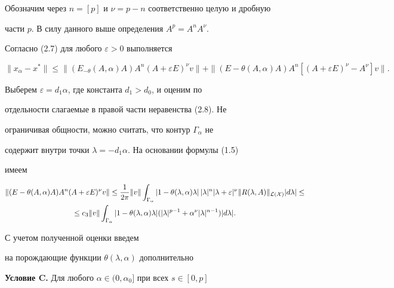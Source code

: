 Обозначим через $n=[p]$ и $\nu=p-n$ соответственно целую и дробную 


части $p$. В силу данного выше определения $A^p=A^n A^\nu$. 


Согласно (2.7) для любого $\varepsilon>0$ выполняется 


\begin{equation} 


\|x_\alpha-x^*\|\le\|(E_{-\theta}(A,\alpha)A)A^n(A+\varepsilon 


E)^\nu v\|+\|(E-\theta(A,\alpha)A)A^n 


[(A+\varepsilon E)^\nu-A^\nu]v\|. 


\end{equation} 


Выберем $\varepsilon=d_1\alpha$, где константа $d_1>d_0$, и оценим по 


отдельности слагаемые в правой части неравенства (2.8). Не 


ограничивая общности, можно считать, что контур $\Gamma_\alpha$ не 


содержит внутри точки $\lambda=-d_1\alpha$. На основании формулы (1.5) 


имеем 


\begin{multline} 


\|(E-\theta(A,\alpha)A)A^n(A+\varepsilon E)^\nu v\| \le 


\frac{1}{2\pi}\|v\|\int_{\Gamma_\alpha} 


|1-\theta(\lambda,\alpha)\lambda|\,|\lambda|^n 


|\lambda+\varepsilon|^\nu\|R(\lambda,A)\|_{\cal L(X)} 


|d\lambda|\le \\ 


% 


\le c_3\|v\|\int_{\Gamma_\alpha} 


|1-\theta(\lambda,\alpha)\lambda| 


(|\lambda|^{p-1}+\alpha^\nu|\lambda|^{n-1})|d\lambda|. 


\end{multline} 


С учетом полученной оценки введем 


на порождающие функции $\theta(\lambda,\alpha)$ дополнительно 


\medskip 


 


{\bf Условие C.} Для любого $\alpha\in(0,\alpha_0]$ при всех $s\in[0,p]$


